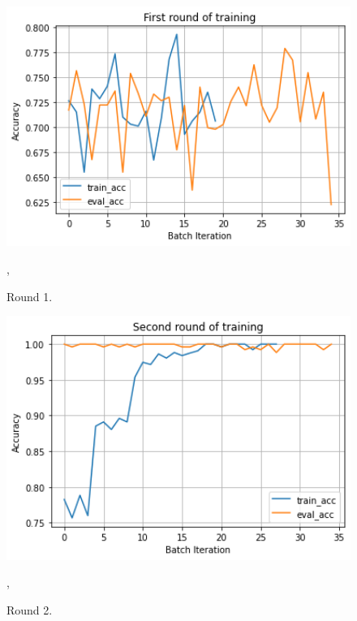 \documentclass[twoside]{article}
\begin{document}
\begin{figure}
\includegraphics[width=1.0\textwidth]{Round1.png}
\caption[]{ 
 Round 1.
 }
\vspace{1mm}, 
\label{fig:round1}
\end{figure}


\begin{figure}
\includegraphics[width=1.0\textwidth]{Round2.png}
\caption[]{ 
 Round 2.
 }
\vspace{1mm}, 
\label{fig:round2}
\end{figure}
\end{document}

